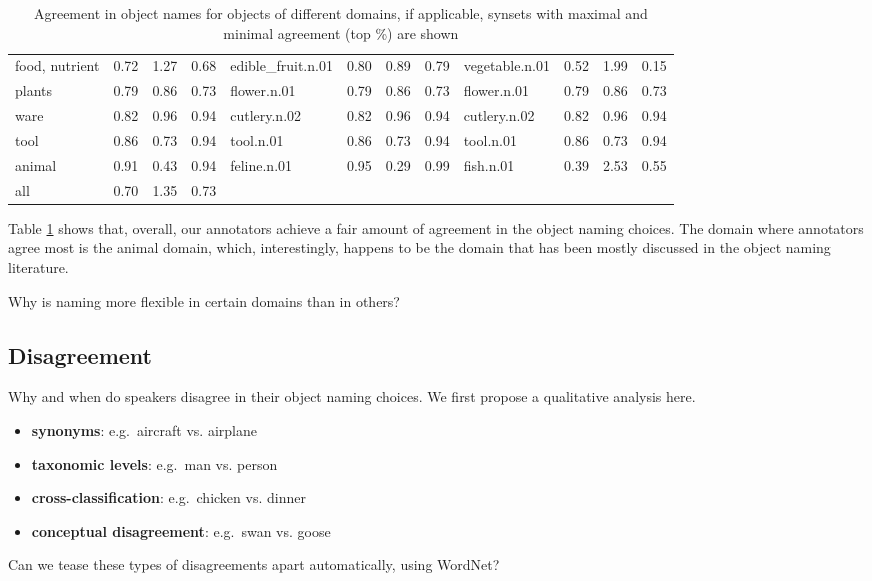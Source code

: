 \documentclass[11pt,a4paper]{article}
\begin{document}
\begin{table}
\begin{tabular}{llll|llll|llll}
                   food, nutrient &  0.72 &  1.27 &  0.68 &  edible\_fruit.n.01 &  0.80 &  0.89 &  0.79 &         vegetable.n.01 &  0.52 &  1.99 &  0.15 \\
         plants &  0.79 &  0.86 &  0.73 &        flower.n.01 &  0.79 &  0.86 &  0.73 &            flower.n.01 &  0.79 &  0.86 &  0.73 \\
                             ware &  0.82 &  0.96 &  0.94 &       cutlery.n.02 &  0.82 &  0.96 &  0.94 &           cutlery.n.02 &  0.82 &  0.96 &  0.94 \\
                             tool &  0.86 &  0.73 &  0.94 &          tool.n.01 &  0.86 &  0.73 &  0.94 &              tool.n.01 &  0.86 &  0.73 &  0.94 \\
                           animal &  0.91 &  0.43 &  0.94 &        feline.n.01 &  0.95 &  0.29 &  0.99 &              fish.n.01 &  0.39 &  2.53 &  0.55 \\
\bottomrule
 all &  0.70 &  1.35 &  0.73            \\

\bottomrule
\end{tabular}
\caption{Agreement in object names for objects of different domains, if applicable, synsets with maximal and minimal agreement (top \%) are shown }
\label{tab:agree}
\end{table}

Table \ref{tab:agree} shows that, overall, our annotators achieve a fair amount of agreement in the object naming choices. The domain where annotators agree most is the animal domain, which, interestingly, happens to be the domain that has been mostly discussed in the object naming literature. 

Why is naming more flexible in certain domains than in others?

\subsection{Disagreement}

Why and when do speakers disagree in their object naming choices. We first propose a qualitative analysis here.


\begin{itemize}
\item \textbf{synonyms}: e.g.\ aircraft vs. airplane 
\item \textbf{taxonomic levels}: e.g.\ man vs. person
\item \textbf{cross-classification}: e.g.\ chicken vs. dinner
\item \textbf{conceptual disagreement}: e.g.\ swan vs. goose
\end{itemize}

Can we tease these types of disagreements apart automatically, using WordNet?
\end{document}
